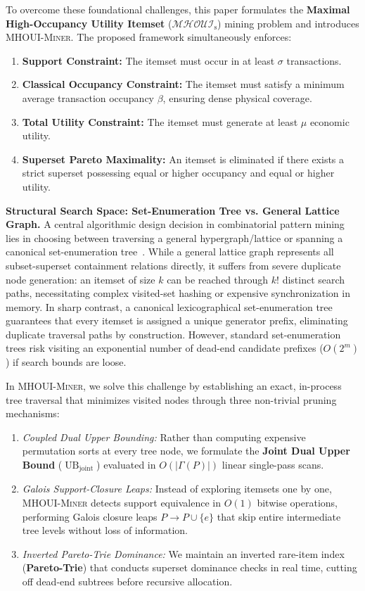 \documentclass[runningheads]{llncs}
\newcommand{\MHOUI}{\ensuremath{\mathcal{MHOUI}_{\mathrm{s}}}}
\newcommand{\MHOUIminer}{\textsc{MHOUI-Miner}}
\newcommand{\UBjoint}{\operatorname{UB}_{\mathrm{joint}}}
\begin{document}
To overcome these foundational challenges, this paper formulates the \textbf{Maximal High-Occupancy Utility Itemset} (\MHOUI{}) mining problem and introduces \MHOUIminer{}. The proposed framework simultaneously enforces:
\begin{enumerate}
    \item \textbf{Support Constraint:} The itemset must occur in at least $\sigma$ transactions.
    \item \textbf{Classical Occupancy Constraint:} The itemset must satisfy a minimum average transaction occupancy $\beta$, ensuring dense physical coverage.
    \item \textbf{Total Utility Constraint:} The itemset must generate at least $\mu$ economic utility.
    \item \textbf{Superset Pareto Maximality:} An itemset is eliminated if there exists a strict superset possessing equal or higher occupancy and equal or higher utility.
\end{enumerate}

\noindent
\textbf{Structural Search Space: Set-Enumeration Tree vs. General Lattice Graph.} A central algorithmic design decision in combinatorial pattern mining lies in choosing between traversing a general hypergraph/lattice or spanning a canonical set-enumeration tree~\cite{rymon1992search}. While a general lattice graph represents all subset-superset containment relations directly, it suffers from severe duplicate node generation: an itemset of size $k$ can be reached through $k!$ distinct search paths, necessitating complex visited-set hashing or expensive synchronization in memory. In sharp contrast, a canonical lexicographical set-enumeration tree guarantees that every itemset is assigned a unique generator prefix, eliminating duplicate traversal paths by construction. However, standard set-enumeration trees risk visiting an exponential number of dead-end candidate prefixes ($O(2^m)$) if search bounds are loose.

In \MHOUIminer{}, we solve this challenge by establishing an exact, in-process tree traversal that minimizes visited nodes through three non-trivial pruning mechanisms:
\begin{enumerate}
    \item \emph{Coupled Dual Upper Bounding:} Rather than computing expensive permutation sorts at every tree node, we formulate the \textbf{Joint Dual Upper Bound} ($\UBjoint$) evaluated in $O(|\Gamma(P)|)$ linear single-pass scans.
    \item \emph{Galois Support-Closure Leaps:} Instead of exploring itemsets one by one, \MHOUIminer{} detects support equivalence in $O(1)$ bitwise operations, performing Galois closure leaps $P \to P \cup \{e\}$ that skip entire intermediate tree levels without loss of information.
    \item \emph{Inverted Pareto-Trie Dominance:} We maintain an inverted rare-item index (\textbf{Pareto-Trie}) that conducts superset dominance checks in real time, cutting off dead-end subtrees before recursive allocation.
\end{enumerate}
\end{document}
